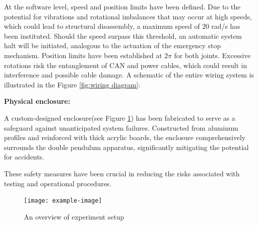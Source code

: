 At the software level, speed and position limits have been defined. Due to the potential for vibrations and rotational imbalances that may occur at high speeds, which could lead to structural disassembly, a maximum speed of \(20\) rad/s has been instituted. Should the speed surpass this threshold, an automatic system halt will be initiated, analogous to the actuation of the emergency stop mechanism. Position limits have been established at \(2\pi\) for both joints. Excessive rotations risk the entanglement of CAN and power cables, which could result in interference and possible cable damage. A schematic of the entire wiring system is illustrated in the Figure \ref{fig:wiring diagram}:

\textbf{Physical enclosure:}

A custom-designed enclosure(see Figure \ref{fig:overview_experiment_setup}) has been fabricated to serve as a safeguard against unanticipated system failures. Constructed from aluminum profiles and reinforced with thick acrylic boards, the enclosure comprehensively surrounds the double pendulum apparatus, significantly mitigating the potential for accidents.

These safety measures have been crucial in reducing the risks associated with testing and operational procedures.

\begin{figure}[H]
    \centering
    \texttt{[image: example-image]}
    \caption{An overview of experiment setup}
    \label{fig:overview_experiment_setup}
\end{figure}

